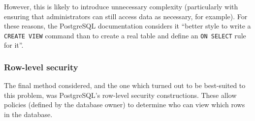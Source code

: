 \documentclass{article}
\begin{document}
However, this is likely to introduce unnecessary complexity (particularly with ensuring that administrators can still access data as necessary, for example). For these reasons, the PostgreSQL documentation considers it ``better style to write a \texttt{CREATE VIEW} command than to create a real table and define an \texttt{ON SELECT} rule for it''\cite{postgres-CREATE_RULE}.

\subsubsection{Row-level security}
The final method considered, and the one which turned out to be best-suited to this problem, was PostgreSQL's row-level security constructions. These allow policies (defined by the database owner) to determine who can view which rows in the database.
\end{document}
